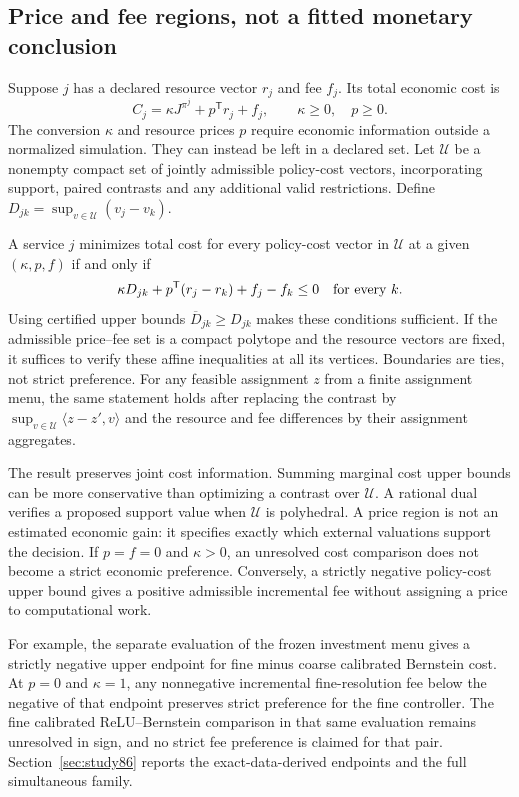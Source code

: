 \subsection{Price and fee regions, not a fitted monetary conclusion}
Suppose $j$ has a declared resource vector $r_j$ and fee $f_j$. Its total economic cost is
\[
 C_j=\kappa J^{\pi^j}+p^{\mathsf T}r_j+f_j,
 \qquad \kappa\ge0,\quad p\ge0.
\]
The conversion $\kappa$ and resource prices $p$ require economic information outside a normalized simulation. They can instead be left in a declared set. Let $\mathcal U$ be a nonempty compact set of jointly admissible policy-cost vectors, incorporating support, paired contrasts and any additional valid restrictions. Define
$D_{jk}=\sup_{v\in\mathcal U}(v_j-v_k)$.

\begin{theorem}\label{thm:prices86}
A service $j$ minimizes total cost for every policy-cost vector in $\mathcal U$ at a given $(\kappa,p,f)$ if and only if
\begin{equation}\label{eq:region86}
 \kappa D_{jk}+p^{\mathsf T}(r_j-r_k)+f_j-f_k\le0
 \quad\hbox{for every }k.
\end{equation}
Using certified upper bounds $\overline D_{jk}\ge D_{jk}$ makes these conditions sufficient. If the admissible price--fee set is a compact polytope and the resource vectors are fixed, it suffices to verify these affine inequalities at all its vertices. Boundaries are ties, not strict preference. For any feasible assignment $z$ from a finite assignment menu, the same statement holds after replacing the contrast by
$\sup_{v\in\mathcal U}\langle z-z',v\rangle$
and the resource and fee differences by their assignment aggregates.
\end{theorem}

The result preserves joint cost information. Summing marginal cost upper bounds can be more conservative than optimizing a contrast over $\mathcal U$. A rational dual verifies a proposed support value when $\mathcal U$ is polyhedral. A price region is not an estimated economic gain: it specifies exactly which external valuations support the decision. If $p=f=0$ and $\kappa>0$, an unresolved cost comparison does not become a strict economic preference. Conversely, a strictly negative policy-cost upper bound gives a positive admissible incremental fee without assigning a price to computational work.

For example, the separate evaluation of the frozen investment menu gives a strictly negative upper endpoint for fine minus coarse calibrated Bernstein cost. At $p=0$ and $\kappa=1$, any nonnegative incremental fine-resolution fee below the negative of that endpoint preserves strict preference for the fine controller. The fine calibrated ReLU--Bernstein comparison in that same evaluation remains unresolved in sign, and no strict fee preference is claimed for that pair. Section~\ref{sec:study86} reports the exact-data-derived endpoints and the full simultaneous family.

